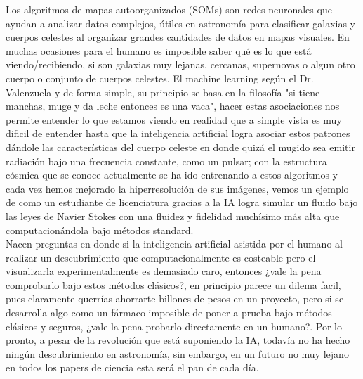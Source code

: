 \documentclass{article}
\begin{document}
Los algoritmos de mapas autoorganizados (SOMs) son redes neuronales que ayudan a analizar datos complejos, útiles en astronomía para clasificar galaxias y cuerpos celestes al organizar grandes cantidades de datos en mapas visuales. En muchas ocasiones para el humano es imposible saber qué es lo que está viendo/recibiendo, si son galaxias muy lejanas, cercanas, supernovas o algun otro cuerpo o conjunto de cuerpos celestes. El machine learning según el Dr. Valenzuela y de forma simple, su principio se basa en la filosofía "si tiene manchas, muge y da leche entonces es una vaca", hacer estas asociaciones nos permite entender lo que estamos viendo en realidad que a simple vista es muy dificil de entender hasta que la inteligencia artificial logra asociar estos patrones dándole las características del cuerpo celeste en donde quizá el mugido sea emitir radiación bajo una frecuencia constante, como un pulsar; con la estructura cósmica que se conoce actualmente se ha ido entrenando a estos algoritmos y cada vez hemos mejorado la hiperresolución de sus imágenes, vemos un ejemplo de como un estudiante de licenciatura gracias a la IA logra simular un fluido bajo las leyes de Navier Stokes con una fluidez y fidelidad muchísimo más alta que computacionándola bajo métodos standard. \\

Nacen preguntas en donde si la inteligencia artificial asistida por el humano al realizar un descubrimiento que computacionalmente es costeable pero el visualizarla experimentalmente es demasiado caro, entonces ¿vale la pena comprobarlo bajo estos métodos clásicos?, en principio parece un dilema facil, pues claramente querrías ahorrarte billones de pesos en un proyecto, pero si se desarrolla algo como un fármaco imposible de poner a prueba bajo métodos clásicos y seguros, ¿vale la pena probarlo directamente en un humano?. Por lo pronto, a pesar de la revolución que está suponiendo la IA, todavía no ha hecho ningún descubrimiento en astronomía, sin embargo, en un futuro no muy lejano en todos los papers de ciencia esta será el pan de cada día.
\end{document}

